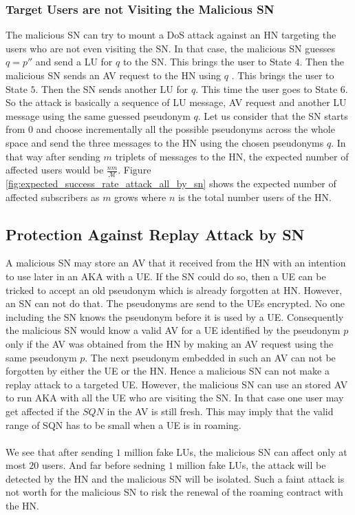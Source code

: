 \documentclass{llncs} %
\begin{document}
\subsubsection{Target Users are not Visiting the Malicious SN} The malicious SN can try to mount a DoS attack against an HN targeting the users who are not even visiting the SN. In that case, the malicious SN guesses $q=p''$ and send a LU for $q$ to the SN. This brings the user to State $4$. Then the malicious SN sends an AV request to the HN using $q$ . This brings the user to State $5$. Then the SN sends another LU for $q$. This time the user goes to State $6$. So the attack is basically a sequence of LU message, AV request and another LU message using the same guessed pseudonym $q$. Let us consider that the SN starts from $0$ and choose incrementally all the possible pseudonyms across the whole space and send the three messages to the HN using the chosen pseudonyms $q$. In that way after sending $m$ triplets of messages to the HN, the expected number of affected users would be $\frac{nm}{\mathcal{M}}$. Figure \ref{fig:expected_success_rate_attack_all_by_sn} shows the expected number of affected subscribers as $m$ grows where $n$ is the total number users of the HN.

\subsection{Protection Against Replay Attack by SN} \label{sec:replay_attack_sn}
A malicious SN may store an AV that it received from the HN with an intention to use later in an AKA with a UE. If the SN could do so, then a UE can be tricked to accept an old pseudonym which is already forgotten at HN. However, an SN can not do that. The pseudonyms are send to the UEs encrypted. No one including the SN knows the pseudonym before it is used by a UE. Consequently the malicious SN would know a valid AV for a UE identified by the pseudonym $p$ only if the AV was obtained from the HN by making an AV request using the same pseudonym $p$. The next pseudonym embedded in such an AV can not be forgotten by either the UE or the HN. Hence a malicious SN can not make a replay attack to a targeted UE. However, the malicious SN can use an stored AV to run AKA with all the UE who are visiting the SN. In that case one user may get affected if the $SQN$ in the AV is still fresh. This may imply that the valid range of SQN has to be small when a UE is in roaming.

\paragraph{} We see that after sending $1$ million fake LUs, the malicious SN can affect only at most $20$ users. And far before sedning $1$ million fake LUs, the attack will be detected by the HN and the malicious SN will be isolated.  Such a faint attack is not worth for the malicious SN to risk the renewal of the roaming contract with the HN.
\end{document}
